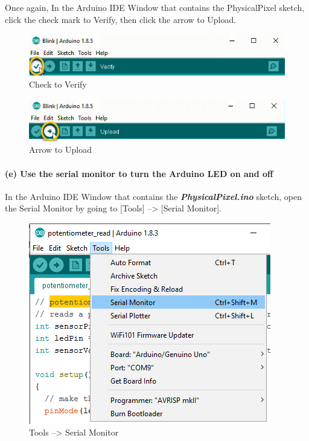 \documentclass[11pt]{article}
\begin{document}
Once again, In the Arduino IDE Window that contains the PhysicalPixel
sketch, click the check mark to Verify, then click the arrow to Upload.

\begin{figure}
\centering
\includegraphics{images/Check_to_Verify.png}
\caption{Check to Verify}
\end{figure}

\begin{figure}
\centering
\includegraphics{images/Arrow_to_Upload.png}
\caption{Arrow to Upload}
\end{figure}

    \hypertarget{e-use-the-serial-monitor-to-turn-the-arduino-led-on-and-off}{%
\paragraph{(e) Use the serial monitor to turn the Arduino LED on and
off}\label{e-use-the-serial-monitor-to-turn-the-arduino-led-on-and-off}}

In the Arduino IDE Window that contains the
\textbf{\emph{PhysicalPixel.ino}} sketch, open the Serial Monitor by
going to {[}Tools{]} --\textgreater{} {[}Serial Monitor{]}.

\begin{figure}
\centering
\includegraphics{images/Tools_SerialMonitor.png}
\caption{Tools --\textgreater{} Serial Monitor}
\end{figure}
\end{document}
